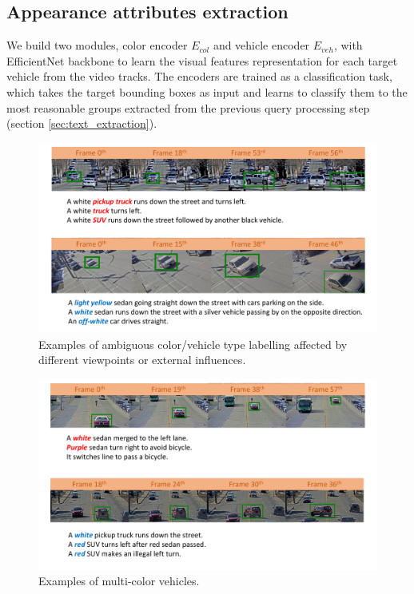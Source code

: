 \subsection{Appearance attributes extraction}
\label{sec:vehcol_extraction}
We build two modules, color encoder $E_{col}$ and vehicle encoder $E_{veh}$, with EfficientNet \cite{tan2019efficientnet} backbone to learn the visual features representation for each target vehicle from the video tracks.
The encoders are trained as a classification task, which takes the target bounding boxes as input and learns to classify them to the most reasonable groups extracted from the previous query processing step (section \ref{sec:text_extraction}). \\
\begin{figure}[!h]
    \centering
    \includegraphics[width=\textwidth]{resources/images/methods/hard_classification.pdf}
    \caption{Examples of ambiguous color/vehicle type labelling affected by different viewpoints or external influences.}
    \label{fig:hard_color}
\end{figure}
\begin{figure}[!h]
    \centering
    \includegraphics[width=\textwidth]{resources/images/methods/multicolor_example.pdf}
    \caption{Examples of multi-color vehicles.}
    \label{fig:multicolor}
\end{figure}
